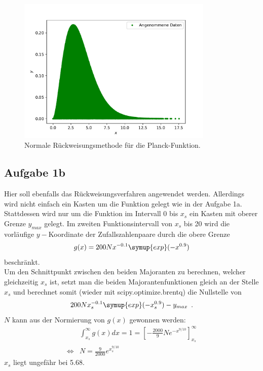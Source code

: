       \begin{figure}[H]
        \centering
        \includegraphics[height=7cm]{planck.pdf}
        \caption{Normale Rückweisungsmethode für die
        Planck-Funktion.}
        \label{fig:planck}
      \end{figure}

    \subsection{Aufgabe 1b}

      Hier soll ebenfalls das Rückweisungsverfahren angewendet werden.
      Allerdings wird nicht einfach ein Kasten um die Funktion gelegt wie in
      der Aufgabe 1a. Stattdessen wird nur um die Funktion
      im Intervall 0 bis $x_s$ ein Kasten mit oberer Grenze $y_{max}$ gelegt.
      Im zweiten Funktionsintervall von $x_s$ bis 20 wird die vorläufige
      $y-$Koordinate der Zufallszahlenpaare durch die obere Grenze
      \begin{align*}
        g(x) = 200Nx^{-0.1}\symup{exp}(-x^{0.9})
      \end{align*}
      beschränkt. \\
      Um den Schnittpunkt zwischen den beiden Majoranten zu berechnen, welcher
      gleichzeitig $x_s$ ist, setzt man die beiden Majorantenfunktionen gleich
      an der Stelle $x_s$ und berechnet somit (wieder mit scipy.optimize.brentq)
      die Nullstelle von
      \begin{align*}
        200Nx_s^{-0.1}\symup{exp}(-x_s^{0.9})-y_{max}\,\,\,.
      \end{align*}
      $N$ kann aus der Normierung von $g(x)$ gewonnen werden:
      \begin{align*}
        &\int_{x_s}^\infty g(x)dx = 1 = \left[-\frac{2000}9Ne^{-x^{9/10}}\right]_{x_s}^\infty\\
        \iff &N=\frac9{2000}e^{x_s^{9/10}}
      \end{align*}
      $x_s$ liegt ungefähr bei 5.68.\\

